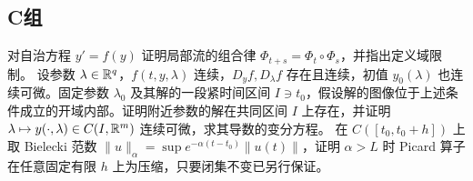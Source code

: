 \subsection*{C组}
\begin{enumerate}[label=\textbf{\thechapter.\arabic*.},resume]
对自治方程 \(y'=f(y)\) 证明局部流的组合律 \(\Phi_{t+s}=\Phi_t\circ\Phi_s\)，并指出定义域限制。
设参数 \(\lambda\in\mathbb{R}^q\)，\(f(t,y,\lambda)\) 连续，\(D_yf,D_\lambda f\) 存在且连续，初值 \(y_0(\lambda)\) 也连续可微。固定参数 \(\lambda_0\) 及其解的一段紧时间区间 \(I\ni t_0\)，假设解的图像位于上述条件成立的开域内部。证明附近参数的解在共同区间 \(I\) 上存在，并证明 \(\lambda\mapsto y(\cdot,\lambda)\in C(I,\mathbb{R}^m)\) 连续可微，求其导数的变分方程。
在 \(C([t_0,t_0+h])\) 上取 Bielecki 范数 \(\|u\|_\alpha=\sup e^{-\alpha(t-t_0)}\|u(t)\|\)，证明 \(\alpha>L\) 时 Picard 算子在任意固定有限 \(h\) 上为压缩，只要闭集不变已另行保证。
\end{enumerate}
